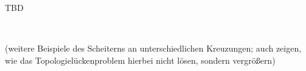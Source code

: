 \documentclass[../main/thesis.tex]{subfiles}
\begin{document}
TBD

~

\noindent
(weitere Beispiele des Scheiterns an unterschiedlichen Kreuzungen; auch zeigen, wie  das Topologielückenproblem hierbei nicht lösen, sondern vergrößern)





\end{document}
